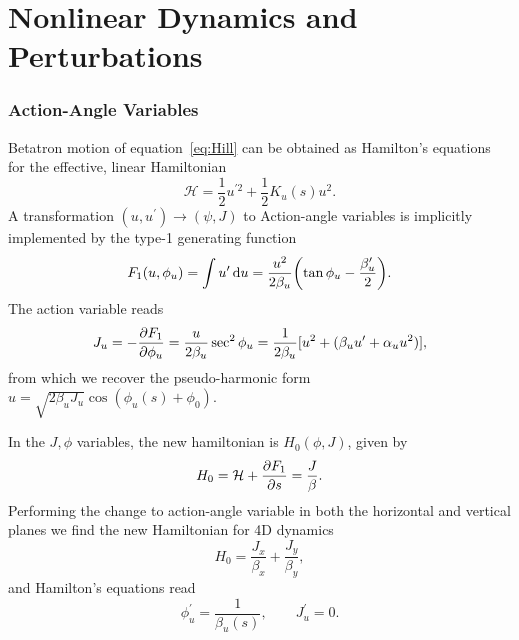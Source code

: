 \section{Nonlinear Dynamics and Perturbations}

\subsubsection{Action-Angle Variables}
Betatron motion of equation~\eqref{eq:Hill} can be obtained as Hamilton's equations for the effective, linear Hamiltonian
\begin{equation}
    \mathcal{H}=\frac{1}{2}u^{\prime2}+\frac{1}{2}K_u(s)u^2.
\end{equation}
A transformation $(u,u^\prime)\to(\psi, J)$ to Action-angle variables is implicitly implemented by the type-1 generating function
\begin{equation}
    F_1(u,\phi_u)=\int{u}^\prime\dd{{u}}=\frac{u^2}{2\beta_u}\qty(\tan \phi_u-\frac{\beta_u^\prime}{2}).
\end{equation}
The action variable reads
\begin{equation}
    J_u=-\pdv{F_1}{\phi_u} = \frac{u}{2\beta_u}\sec^2\phi_u = \frac{1}{2\beta_u}[u^2 + (\beta_u u^\prime + \alpha_u u^2)],
    \label{eq:action}
\end{equation}
from which we recover the pseudo-harmonic form $u=\sqrt{2\beta_u J_u}\cos(\phi_u(s)+\phi_0)$.

In the $J,\phi$ variables, the new hamiltonian is $H_0(\phi, J)$,  given by
\begin{equation}
    H_0=\mathcal{H}+\pdv{F_1}{s} = \frac{J}{\beta}.
\end{equation}
Performing the change to action-angle variable in both the horizontal and vertical planes we find the new Hamiltonian for 4D dynamics
\begin{equation}
    H_0= \frac{J_x}{\beta_x} +  \frac{J_y}{\beta_y},
\end{equation}
and Hamilton's equations read
\begin{equation}
    \phi_u^\prime = \frac{1}{\beta_u(s)},\qquad J_u^\prime=0.
\end{equation}
